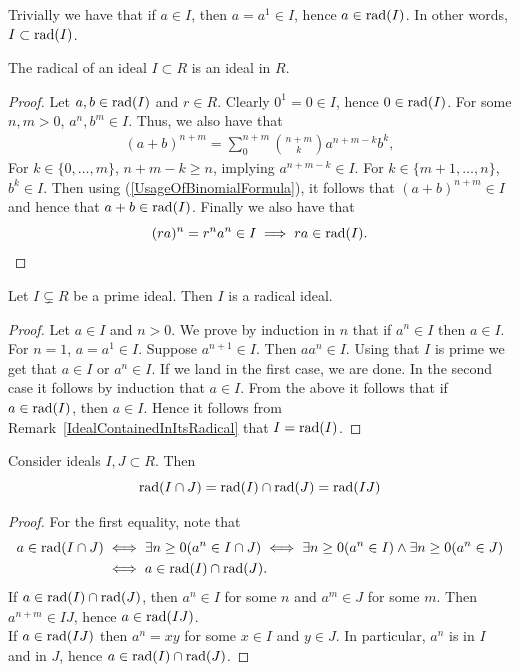 \begin{remark}\label{IdealContainedInItsRadical}
    Trivially we have that if $a\in I$, then $a=a^1\in I$, hence $a\in \mathrm{rad}(I)$. In other words, $I\subset \mathrm{rad}(I)$.
\end{remark}
\begin{lemma}
    The radical of an ideal $I\subset R$ is an ideal in $R$.
\end{lemma}
\begin{proof}
    Let $a,b \in \mathrm{rad}(I)$ and $r\in R$. Clearly $0^1=0\in I$, hence $0\in \mathrm{rad}(I)$. For some $n,m>0$, $a^n,b^m\in I$. Thus, we also have that 
    \begin{align}\label{UsageOfBinomialFormula}
        (a+b)^{n+m} = \sum_{0}^{n+m} {n+m\choose k} a^{n+m-k}b^k,
    \end{align}
    For $k\in \{0,\dots,m\}$, $n+m-k\geq n$, implying $a^{n+m-k}\in I$. For $k\in \{m+1,\dots,n\}$, $b^k \in I$. Then using (\ref{UsageOfBinomialFormula}), it follows that $(a+b)^{n+m}\in I$ and hence that $a+b \in \mathrm{rad}(I)$. Finally we also have that 
    $$(ra)^n = r^na^n\in I \implies ra\in \mathrm{rad}(I).$$
\end{proof}
\begin{lemma}\label{PrimeIdealIsRadical}
    Let $I\subsetneq R$ be a prime ideal. Then $I$ is a radical ideal.
\end{lemma}
\begin{proof}
    Let $a\in I$ and $n>0$. We prove by induction in $n$ that if $a^n \in I$ then $a \in I$. For $n=1$, $a = a^1\in I$. Suppose $a^{n+1}\in I$. Then $aa^n\in I$. Using that $I$ is prime we get that $a \in I$ or $a^n \in I$. If we land in the first case, we are done. In the second case it follows by induction that $a \in I$.   
    From the above it follows that if $a \in \mathrm{rad}(I)$, then $a \in I$. Hence it follows from Remark~\ref{IdealContainedInItsRadical} that $I = \mathrm{rad}(I)$.
\end{proof}
\begin{lemma}
    Consider ideals $I,J\subset R$. Then 
    $$
        \mathrm{rad}(I\cap J) = \mathrm{rad}(I)\cap \mathrm{rad}(J) = \mathrm{rad}(IJ)
    $$
\end{lemma}
\begin{proof}
    For the first equality, note that 
    \begin{align*}
        a\in \mathrm{rad}(I\cap J) &\iff \exists n\geq 0(a^n \in I\cap J) \iff \exists n\geq 0(a^n\in I) \wedge \exists n\geq 0(a^n \in J)\\ &\iff a\in \mathrm{rad}(I)\cap \mathrm{rad}(J).
    \end{align*}
    If $a\in \mathrm{rad}(I)\cap \mathrm{rad}(J)$, then $a^n\in I$ for some $n$ and $a^m\in J$ for some $m$. Then $a^{n+m}\in IJ$, hence $a\in \mathrm{rad}(IJ)$.\\
    If $a\in \mathrm{rad}(IJ)$ then $a^n = xy$ for some $x\in I$ and $y\in J$. In particular, $a^n$ is in $I$ and in $J$, hence $a\in \mathrm{rad}(I)\cap \mathrm{rad}(J)$. 
\end{proof}
